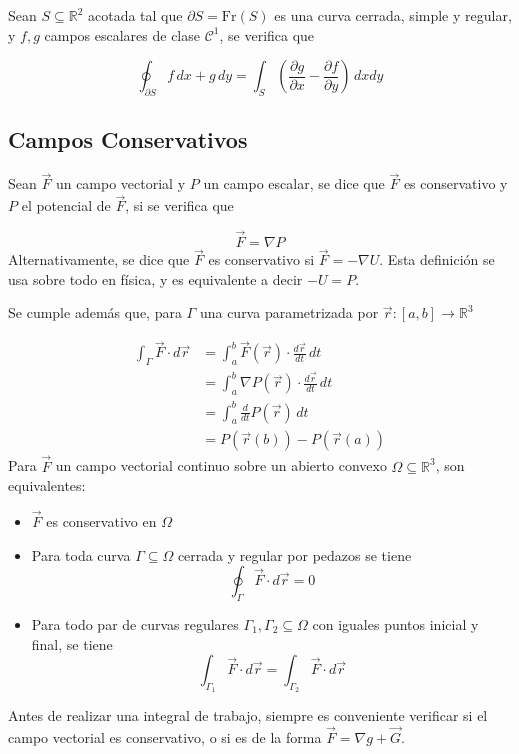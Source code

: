 Sean $S\subseteq\mathbb{R}^2$ acotada tal que $\partial S = \mathrm{Fr}(S)$ es una curva cerrada, simple y regular, y $f,g$ campos escalares de clase $\mathcal{C}^1$, se verifica que

\[\oint_{\partial S}f\,dx+g\,dy = \int_S
\left(\frac{\partial g}{\partial x}-
\frac{\partial f}{\partial y}\right)\,dxdy\]

\subsection{Campos Conservativos}

Sean $\Vec{F}$ un campo vectorial y $P$ un campo escalar, se dice que $\Vec{F}$ es conservativo y $P$ el potencial de $\Vec{F}$, si se verifica que

\[\Vec{F} = \nabla P\]
\bigbreak
Alternativamente, se dice que $\Vec{F}$ es conservativo si $\Vec{F} = -\nabla U$. Esta definición se usa sobre todo en física, y es equivalente a decir $-U = P$.

\bigbreak
Se cumple además que, para $\Gamma$ una curva parametrizada por $\Vec{r}:[a,b]\to\mathbb{R}^3$

\begin{equation}
\begin{split}
    \int_\Gamma\Vec{F}\cdot d\Vec{r} &=
    \int^b_a\Vec{F}(\Vec{r})\cdot\frac{d\Vec{r}}{dt}\,dt\\
    &=\int^b_a\nabla P(\Vec{r})\cdot\frac{d\Vec{r}}{dt}\,dt\\
    &=\int^b_a\frac{d}{dt} P(\Vec{r})\,dt\\
    &=P(\Vec{r}(b))-P(\Vec{r}(a))
\end{split}
\nonumber
\end{equation}
\bigbreak
Para $\Vec{F}$ un campo vectorial continuo sobre un abierto convexo $\Omega\subseteq\mathbb{R}^3$, son equivalentes:

\begin{itemize}
    \item $\Vec{F}$ es conservativo en $\Omega$
    \item Para toda curva $\Gamma\subseteq\Omega$ cerrada y regular por pedazos se tiene
    \[\oint_\Gamma\Vec{F}\cdot d\Vec{r}=0\]
    \item Para todo par de curvas regulares $\Gamma_1, \Gamma_2\subseteq\Omega$ con iguales puntos inicial y final, se tiene
    \[\int_{\Gamma_1}\Vec{F}\cdot d\Vec{r} =
    \int_{\Gamma_2}\Vec{F}\cdot d\Vec{r}\]
\end{itemize}

Antes de realizar una integral de trabajo, siempre es conveniente verificar si el campo vectorial es conservativo, o si es de la forma $\Vec{F}=\nabla g + \Vec{G}$.

\newpage